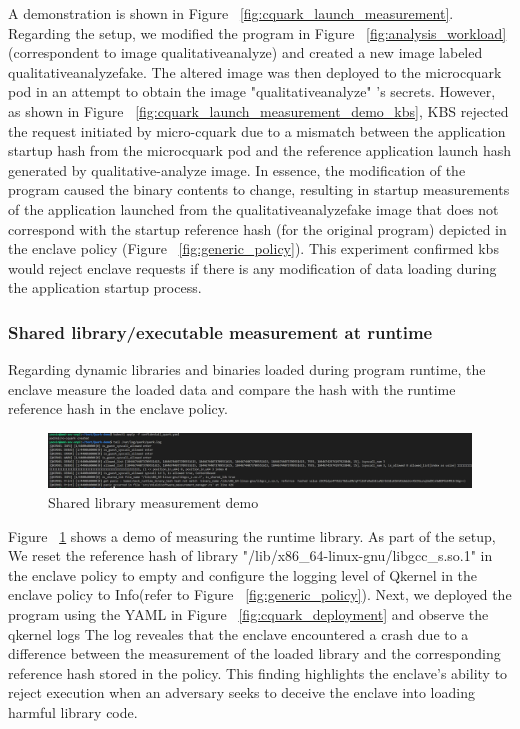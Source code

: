 A demonstration is shown in Figure ~\ref{fig:cquark_launch_measurement}. Regarding the setup, we modified the program in Figure ~\ref{fig:analysis_workload} (correspondent to image qualitative\-analyze) and created a new image labeled qualitative\-analyze\-fake. The altered image was then deployed to 
the micro\-cquark pod in an attempt to obtain the image "qualitative\-analyze" 's secrets. However, as shown in Figure ~\ref{fig:cquark_launch_measurement_demo_kbs}, KBS rejected the request initiated by micro-cquark due to a mismatch between the application startup hash from the micro\-cquark
 pod and the reference application launch hash generated by qualitative-analyze image. In essence, the modification of the program caused the binary contents to change, resulting in startup measurements of the application launched from the 
 qualitative\-analyze\-fake image that does not correspond with the startup reference hash (for the original program) depicted in the enclave policy (Figure ~\ref{fig:generic_policy}). This experiment confirmed kbs would reject enclave requests if there is any modification 
 of data loading during the application startup process.


\subsubsection{Shared library/executable measurement at runtime}
Regarding dynamic libraries and binaries loaded during program runtime, the enclave  measure the loaded data and compare the hash with the runtime reference hash in the enclave policy.

\begin{figure}[H]
    \centering
    \includegraphics[width=1\textwidth]{images/cquark_runtime_runtime_lib_measurement_demo.png}
    \caption[Shared library measurement demo]{Shared library measurement demo}
    \label{fig:cquark_runtime_runtime_lib_measurement_demo}
\end{figure}

Figure ~\ref{fig:cquark_runtime_runtime_lib_measurement_demo} shows a demo of measuring the runtime library. As part of the setup, We reset the reference hash of  library "/lib/x86\_64-linux-gnu/libgcc\_s.so.1" in the enclave policy to empty and configure the logging level 
of Qkernel in the enclave policy to Info(refer to Figure ~\ref{fig:generic_policy}). Next, we deployed the program using the YAML in Figure ~\ref{fig:cquark_deployment} and observe the qkernel logs  The log reveales that the enclave encountered 
a crash due to a difference between the measurement of the loaded library and the corresponding reference hash stored in the policy. This finding highlights the enclave's ability to reject execution when an adversary seeks to deceive the enclave 
into loading harmful library code.


